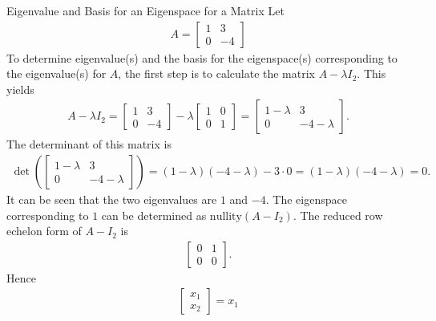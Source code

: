 \begin{example}{Eigenvalue and Basis for an Eigenspace for a Matrix}
    Let
    \begin{align*}
        A=
        \begin{bmatrix}
            1 & 3\\
            0 & -4
        \end{bmatrix}
    \end{align*}
    To determine eigenvalue(s) and the basis for the eigenspace(s) corresponding to the eigenvalue(s) for $A$, the first step is to calculate the matrix $A-\lambda I_2$. This yields
    \begin{align*}
        A-\lambda I_2=
         \begin{bmatrix}
            1 & 3\\
            0 & -4
        \end{bmatrix} -\lambda
        \begin{bmatrix}
            1 & 0\\
            0 & 1
        \end{bmatrix}=
        \begin{bmatrix}
            1-\lambda & 3\\
            0 & -4-\lambda
        \end{bmatrix}.
    \end{align*}
    The determinant of this matrix is
    \begin{align*}
        \det \left(\begin{bmatrix}
            1-\lambda & 3\\
            0 & -4-\lambda
        \end{bmatrix} \right)=(1-\lambda)(-4-\lambda)-3\cdot0=(1-\lambda)(-4-\lambda)=0.
    \end{align*}
   It can be seen that the two eigenvalues are $1$ and $-4$. 
   The eigenspace corresponding to $1$ can be determined as $\text{nullity}(A-I_2)$. The reduced row echelon form of $A-I_2$ is
    \begin{align*}
            \begin{bmatrix}
                0 & 1\\
                0 & 0
            \end{bmatrix}.
    \end{align*}
    Hence
    \begin{align*}
        \begin{bmatrix}
            x_1\\x_2
        \end{bmatrix}=x_1

\end{align*}
\end{example}
